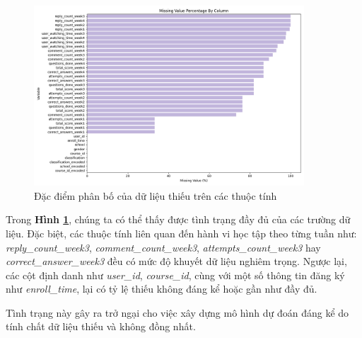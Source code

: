 \begin{figure}[H]
    \centering
    \includegraphics[width=0.9\textwidth]{imgs/missing-values-chart.png}
    \caption{Đặc điểm phân bố của dữ liệu thiếu trên các thuộc tính}
    \label{fig:percentage of missing values}
\end{figure}


 Trong \textbf{Hình \ref{fig:percentage of missing values}}, chúng ta có thể thấy được tình trạng đầy đủ của các trường dữ liệu. Đặc biệt, các thuộc tính liên quan đến hành vi học tập theo từng tuần như: \textit{reply\_count\_week3}, \textit{comment\_count\_week3}, \textit{attempts\_count\_week3} hay \textit{correct\_answer\_week3} đều có mức độ khuyết dữ liệu nghiêm trọng. Ngược lại, các cột định danh như \textit{user\_id}, \textit{course\_id}, cùng với một số thông tin đăng ký như \textit{enroll\_time}, lại có tỷ lệ thiếu không đáng kể hoặc gần như đầy đủ.

Tình trạng này gây ra trở ngại cho việc xây dựng mô hình dự đoán đáng kể do tính chất dữ liệu thiếu và không đồng nhất.




